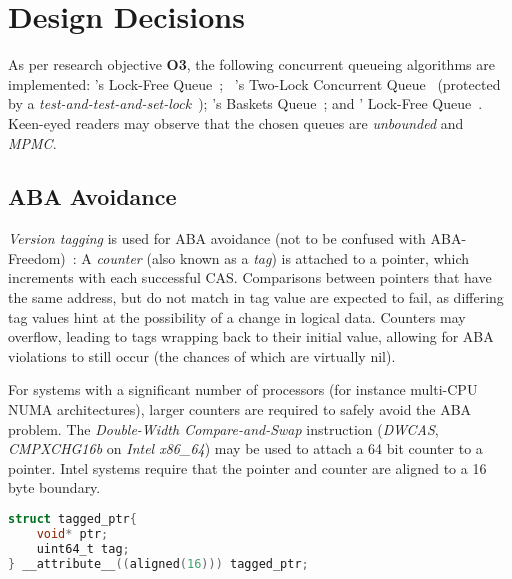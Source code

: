 \section{Design Decisions\label{sec:design_and_implementation_design_decisions}}
As per research objective \textbf{O3}, the following concurrent queueing
algorithms are implemented:
\citeauthor{michael1996simple}'s Lock-Free Queue~\citep{michael1996simple};
~\citeauthor{michael1996simple}'s Two-Lock Concurrent
Queue~\citep{michael1996simple} (protected by a \emph{test-and-test-and-set-lock}~\citep{mellor1991algorithms}); \citeauthor{hoffman2007baskets}'s Baskets
Queue~\citep{hoffman2007baskets}; and \citeauthor{valois1994queues}' Lock-Free
Queue~\citep{valois1994queues}. Keen-eyed readers may observe that the chosen
queues are \emph{unbounded} and \emph{MPMC}.

\subsection{ABA Avoidance}

\emph{Version tagging} is used for ABA avoidance (not to be confused with
ABA-Freedom)~\citep{dechev2010understanding}:
A \emph{counter} (also known as a \emph{tag}) is attached to a pointer, which increments with
each successful CAS. Comparisons between pointers that have the same address,
but do not match in tag value are expected to fail, as differing tag values hint
at the possibility of a change in logical data. Counters may overflow, leading to tags wrapping back
to their initial value, allowing for ABA violations to still occur (the chances
of which are virtually nil).

For systems with a significant number of processors (for instance multi-CPU
NUMA architectures), larger counters are required  to safely avoid the ABA
problem. The \emph{Double-Width Compare-and-Swap} instruction (\emph{DWCAS},
\emph{CMPXCHG16b} on \emph{Intel x86\_64}) may be used to attach a 64 bit
counter to a pointer. 
Intel systems require that the pointer and counter are aligned to a 16 byte
boundary.

\begin{lstlisting}[language=C,caption={Struct aligned to 16 bytes, as required by the DWCAS instruction.}]
struct tagged_ptr{
    void* ptr;
    uint64_t tag;
} __attribute__((aligned(16))) tagged_ptr;
\end{lstlisting}

